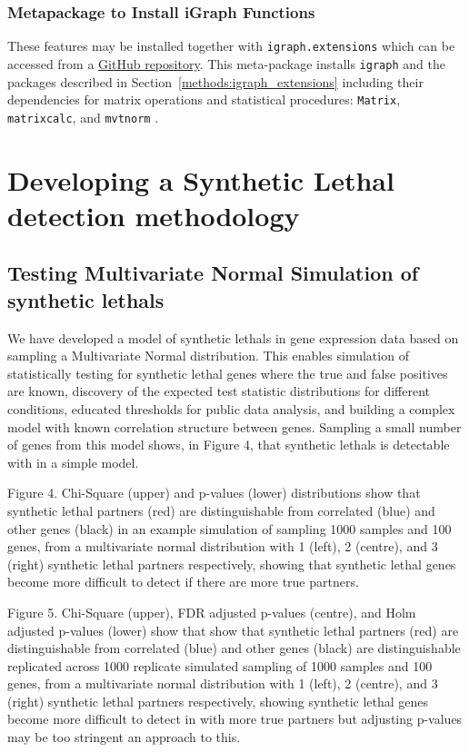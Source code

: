 \subsubsection{Metapackage to Install iGraph Functions}
These features may be installed together with \texttt{igraph.extensions} which can be accessed from a \href{https://github.com/TomKellyGenetics/igraph.extensions}{GitHub repository}. This meta-package installs \texttt{igraph} \citep{igraph} and the packages described in Section~\ref{methods:igraph_extensions} including their dependencies for matrix operations and statistical procedures: \texttt{Matrix}, \texttt{matrixcalc}, and \texttt{mvtnorm} \citep{Matrix, matrixcalc, Genz2009, mvtnorm}.


\iffalse
\section{Developing a Synthetic Lethal detection methodology}

\subsection{Testing Multivariate Normal Simulation of \Glspl{synthetic lethal}}

We have developed a model of \glspl{synthetic lethal} in \gls{gene expression} data based on sampling a Multivariate Normal distribution.  This enables simulation of statistically testing for \gls{synthetic lethal} genes where the true and false positives are known, discovery of the expected test statistic distributions for different conditions, educated thresholds for public data analysis, and building a complex model with known correlation structure between genes.  Sampling a small number of genes from this model shows, in Figure 4, that \glspl{synthetic lethal} is detectable with in a simple model.

Figure 4.  Chi-Square (upper) and p-values (lower) distributions show that \gls{synthetic lethal} partners (red) are distinguishable from correlated (blue) and other genes (black) in an example simulation of sampling 1000 samples and 100 genes, from a multivariate normal distribution with 1 (left), 2 (centre), and 3 (right) \gls{synthetic lethal} partners respectively, showing that \gls{synthetic lethal} genes become more difficult to detect if there are more true partners.

Figure 5.  Chi-Square (upper), \gls{FDR} adjusted p-values (centre), and Holm adjusted p-values (lower) show that show that \gls{synthetic lethal} partners (red) are distinguishable from correlated (blue) and other genes (black) are distinguishable replicated across 1000 replicate simulated sampling of 1000 samples and 100 genes, from a multivariate normal distribution with 1 (left), 2 (centre), and 3 (right) \gls{synthetic lethal} partners respectively, showing \gls{synthetic lethal} genes become more difficult to detect in with more true partners but adjusting p-values may be too stringent an approach to this.

